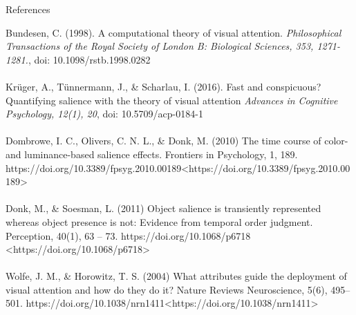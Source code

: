 \documentclass[a0paper,portrait]{baposter}
\begin{document}
\begin{poster}
		\begin{posterbox}[name=refs,column=0,span=2,below=procedure,above=bottom]{References}
			\footnotesize
			\linespread{1}
			
			{\color{upbblue}Bundesen, C. } ({\color{upbblue}1998}). A computational theory of visual attention. \textit{Philosophical Transactions of the Royal Society of London B: Biological Sciences, 353, 1271-1281.}, doi: 10.1098/rstb.1998.0282 
			\\\\
			{\color{upbblue}Krüger, A., Tünnermann, J., \& Scharlau, I.} ({\color{upbblue}2016}). Fast and conspicuous? Quantifying salience with the theory of visual attention \textit{Advances in Cognitive Psychology, 12(1), 20}, doi: 10.5709/acp-0184-1
			\\\\
			{\color{upbblue}Dombrowe, I. C., Olivers, C. N. L., \& Donk, M. (2010)} The time course of color- and luminance-based salience effects. Frontiers in Psychology, 1, 189. https://doi.org/10.3389/fpsyg.2010.00189<https://doi.org/10.3389/fpsyg.2010.00189>
			\\\\
			{\color{upbblue}Donk, M., \& Soesman, L. (2011)} Object salience is transiently represented whereas object presence is not: Evidence from temporal order judgment. Perception, 40(1), 63 – 73. https://doi.org/10.1068/p6718 <https://doi.org/10.1068/p6718>
			\\\\
			{\color{upbblue}Wolfe, J. M., \& Horowitz, T. S. (2004)} What attributes guide the deployment of visual attention and how do they do it? Nature Reviews Neuroscience, 5(6), 495–501. https://doi.org/10.1038/nrn1411<https://doi.org/10.1038/nrn1411>
		\end{posterbox}
		
	\end{poster}
\end{document}
